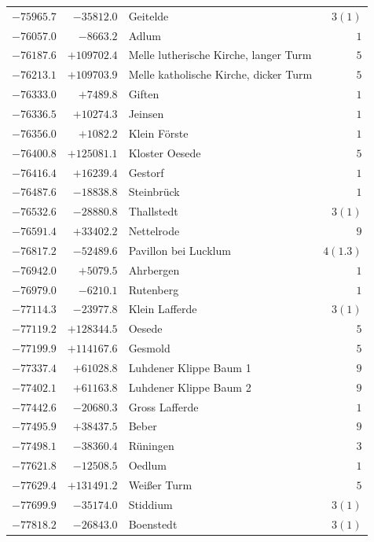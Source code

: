 \begin{center}
\begin{tabular}{r|r|p{170pt}|r}
\(-75965.7\)&\(-35812.0\)&Geitelde&\(3 (1)\)\\
\(-76057.0\)&\(-8663.2\)&Adlum&\(1\)\\
\(-76187.6\)&\(+109702.4\)&Melle lutherische Kirche, langer Turm&\(5\)\\
\(-76213.1\)&\(+109703.9\)&Melle katholische Kirche, dicker Turm&\(5\)\\
\(-76333.0\)&\(+7489.8\)&Giften&\(1\)\\
\(-76336.5\)&\(+10274.3\)&Jeinsen&\(1\)\\
\(-76356.0\)&\(+1082.2\)&Klein Förste&\(1\)\\
\(-76400.8\)&\(+125081.1\)&Kloster Oesede&\(5\)\\
\(-76416.4\)&\(+16239.4\)&Gestorf&\(1\)\\
\(-76487.6\)&\(-18838.8\)&Steinbrück&\(1\)\\
\(-76532.6\)&\(-28880.8\)&Thallstedt&\(3 (1)\)\\
\(-76591.4\)&\(+33402.2\)&Nettelrode&\(9\)\\
\(-76817.2\)&\(-52489.6\)&Pavillon bei Lucklum&\(4(1.3)\)\\
\(-76942.0\)&\(+5079.5\)&Ahrbergen&\(1\)\\
\(-76979.0\)&\(-6210.1\)&Rutenberg&\(1\)\\
\(-77114.3\)&\(-23977.8\)&Klein Lafferde&\(3 (1)\)\\
\(-77119.2\)&\(+128344.5\)&Oesede&\(5\)\\
\(-77199.9\)&\(+114167.6\)&Gesmold&\(5\)\\
\(-77337.4\)&\(+61028.8\)&Luhdener Klippe Baum 1&\(9\)\\
\(-77402.1\)&\(+61163.8\)&Luhdener Klippe Baum 2&\(9\)\\
\(-77442.6\)&\(-20680.3\)&Gross Lafferde&\(1\)\\
\(-77495.9\)&\(+38437.5\)&Beber&\(9\)\\
\(-77498.1\)&\(-38360.4\)&Rüningen&\(3\)\\
\(-77621.8\)&\(-12508.5\)&Oedlum&\(1\)\\
\(-77629.4\)&\(+131491.2\)&Weißer Turm&\(5\)\\
\(-77699.9\)&\(-35174.0\)&Stiddium&\(3 (1)\)\\
\(-77818.2\)&\(-26843.0\)&Boenstedt&\(3 (1)\)\\
\hline\end{tabular}\endgroup\end{center}
\clearpage
